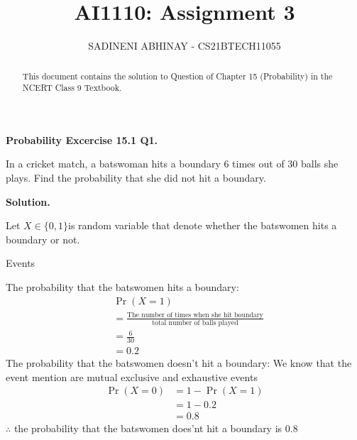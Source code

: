 \documentclass[journal,12pt,twocolumn]{IEEEtran}
\title{
	AI1110: Assignment 3
}
\author{ 
	SADINENI ABHINAY - CS21BTECH11055
}
\providecommand{\pr}[1]{\ensuremath{\Pr\left(#1\right)}}
\begin{document}
	\maketitle
	\begin{abstract}
		This document contains the solution to Question of Chapter 15 (Probability) in the NCERT Class 9 Textbook.
	\end{abstract}
	
	\textbf{Probability Excercise 15.1 Q1.}
	
	In a cricket match, a batswoman hits a boundary 6 times out of 30 balls she plays. Find the probability that she did not hit a boundary.
	
	\textbf{Solution.}
	
	Let $X \in \{0,1\} $is random variable that denote whether the batswomen hits a boundary or not.
	
	\begin{table}[ht!]
		\centering
		
		\caption{Events}
		\label{table:1}
	\end{table}
The probability that the batswomen hits a  boundary:
\begin{align}
	 &\pr{X=1}\\
&=\frac{\text{The number of times when she hit boundary}}{\text{total number of balls played}}\\
	&=\frac{6}{30}\\
	&=0.2
\end{align}
The probability that the batswomen doesn't hit a boundary:
We know that the event mention are mutual exclusive and exhaustive events 
\begin{align}
	\pr{X=0}&=1-\pr{X=1}\\
	&=1-0.2\\
	&=0.8
\end{align}
	$\therefore$ the probability that the batswomen does'nt hit
	 a boundary is 0.8
\end{document}

